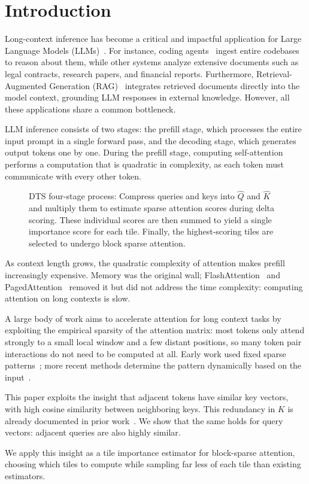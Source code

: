 \section{Introduction}




Long-context inference has become a critical and impactful application for Large Language Models (LLMs)~\cite{dubey2024llama3, qwen25, Qwen2-VL, reid2024gemini, liu2023ring}. For instance, coding agents~\cite{yang2024sweagent} ingest entire codebases to reason about them, while other systems analyze extensive documents such as legal contracts, research papers, and financial reports. Furthermore, Retrieval-Augmented Generation (RAG)~\cite{lewis2020retrieval} integrates retrieved documents directly into the model context, grounding LLM responses in external knowledge. However, all these applications share a common bottleneck.


LLM inference consists of two stages: the prefill stage, which processes the entire input prompt in a single forward pass, and the decoding stage, which generates output tokens one by one. During the prefill stage, computing self-attention performs a computation that is quadratic in complexity, as each token must communicate with every other token.
\begin{figure}[t]
    \centering
    
    \caption{DTS four-stage process: Compress queries and keys into $\hat{Q}$ and $\hat{K}$ and multiply them to estimate sparse attention scores during delta scoring. These individual scores are then summed to yield a single importance score for each tile. Finally, the highest-scoring tiles are selected to undergo block sparse attention.}
    \label{fig:dts_flow}
\end{figure}

As context length grows, the quadratic complexity of attention makes prefill increasingly expensive.
Memory was the original wall; FlashAttention~\cite{dao2022flashattention, dao2023flashattention2, shah2024flashattention3} and PagedAttention~\cite{kwon2023efficient} removed it but did not address the time complexity: computing attention on long contexts is slow.

A large body of work aims to accelerate attention for long context tasks by exploiting the empirical sparsity of the attention matrix: most tokens only attend strongly to a small local window and a few distant positions, so many token pair interactions do not need to be computed at all.
Early work used fixed sparse patterns~\cite{child2019generating, Beltagy2020Longformer, zaheer2020bigbird}; more recent methods determine the pattern dynamically based on the input~\cite{jiang2024minference, lai2025flexprefill, xu2025xattention}.

This paper exploits the insight that adjacent tokens have similar key vectors, with high cosine similarity between neighboring keys. This redundancy in $K$ is already documented in prior work~\cite{wang2024kvmerger, qi2024deltallm}. We show that the same holds for query vectors: adjacent queries are also highly similar. 

We apply this insight as a tile importance estimator for block-sparse attention, choosing which tiles to compute while sampling far less of each tile than existing estimators.
